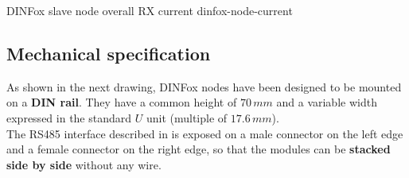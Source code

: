 {DINFox slave node overall RX current}
{dinfox-node-current}
\newpage

\subsection{Mechanical specification}

As shown in the next drawing, DINFox nodes have been designed to be mounted on a \textbf{DIN rail}. They have a common height of $ 70\,mm $ and a variable width expressed in the standard $ U $ unit (multiple of $ 17.6\,mm $).
\medskip \\
The RS485 interface described in  is exposed on a male connector on the left edge and a female connector on the right edge, so that the modules can be \textbf{stacked side by side} without any wire.

\vspace{10mm}

\begin{figure}[h]
    \centering
    \vspace*{10mm}
\end{figure}

\newpage